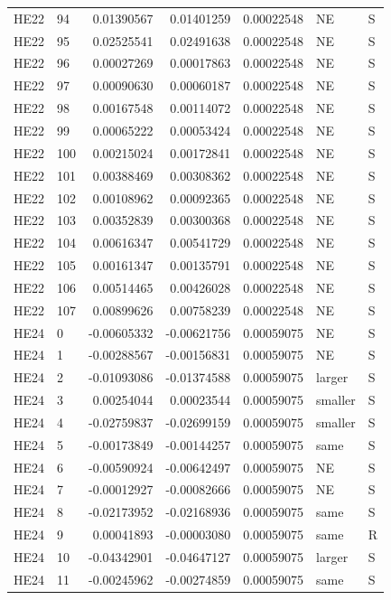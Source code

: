 \documentclass[11pt]{article}
\begin{document}
{\begin{longtable}{llrrrll}
HE22 & 94 & 0.01390567 & 0.01401259 & 0.00022548 & NE & S\\
HE22 & 95 & 0.02525541 & 0.02491638 & 0.00022548 & NE & S\\
HE22 & 96 & 0.00027269 & 0.00017863 & 0.00022548 & NE & S\\
HE22 & 97 & 0.00090630 & 0.00060187 & 0.00022548 & NE & S\\
HE22 & 98 & 0.00167548 & 0.00114072 & 0.00022548 & NE & S\\
HE22 & 99 & 0.00065222 & 0.00053424 & 0.00022548 & NE & S\\
HE22 & 100 & 0.00215024 & 0.00172841 & 0.00022548 & NE & S\\
HE22 & 101 & 0.00388469 & 0.00308362 & 0.00022548 & NE & S\\
HE22 & 102 & 0.00108962 & 0.00092365 & 0.00022548 & NE & S\\
HE22 & 103 & 0.00352839 & 0.00300368 & 0.00022548 & NE & S\\
HE22 & 104 & 0.00616347 & 0.00541729 & 0.00022548 & NE & S\\
HE22 & 105 & 0.00161347 & 0.00135791 & 0.00022548 & NE & S\\
HE22 & 106 & 0.00514465 & 0.00426028 & 0.00022548 & NE & S\\
HE22 & 107 & 0.00899626 & 0.00758239 & 0.00022548 & NE & S\\
HE24 & 0 & -0.00605332 & -0.00621756 & 0.00059075 & NE & S\\
HE24 & 1 & -0.00288567 & -0.00156831 & 0.00059075 & NE & S\\
HE24 & 2 & -0.01093086 & -0.01374588 & 0.00059075 & larger & S\\
HE24 & 3 & 0.00254044 & 0.00023544 & 0.00059075 & smaller & S\\
HE24 & 4 & -0.02759837 & -0.02699159 & 0.00059075 & smaller & S\\
HE24 & 5 & -0.00173849 & -0.00144257 & 0.00059075 & same & S\\
HE24 & 6 & -0.00590924 & -0.00642497 & 0.00059075 & NE & S\\
HE24 & 7 & -0.00012927 & -0.00082666 & 0.00059075 & NE & S\\
HE24 & 8 & -0.02173952 & -0.02168936 & 0.00059075 & same & S\\
HE24 & 9 & 0.00041893 & -0.00003080 & 0.00059075 & same & R\\
HE24 & 10 & -0.04342901 & -0.04647127 & 0.00059075 & larger & S\\
HE24 & 11 & -0.00245962 & -0.00274859 & 0.00059075 & same & S\\

\end{longtable}}
\end{document}
